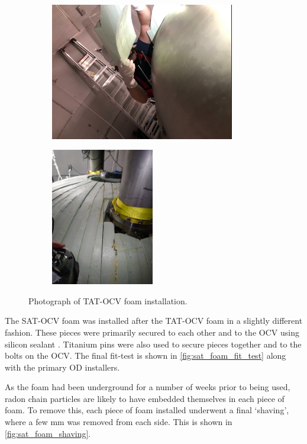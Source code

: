 \begin{figure}[]
\begin{subfigure}{.5\textwidth}
  \centering
  \includegraphics[height=6cm, width=\linewidth]{Figures/Construction/TAT_foam_installation.png}
  \end{subfigure}
  \begin{subfigure}{.5\textwidth}
  \centering
  \includegraphics[height=6cm, width=\linewidth, angle=-90,]{Figures/Construction/TAT_foam_complete.jpg}
  \end{subfigure}
\caption{Photograph of TAT-OCV foam installation.}
\label{fig:TAT_foam_installation}
\end{figure}

\par
The SAT-OCV foam was installed after the TAT-OCV foam in a slightly different fashion.
These pieces were primarily secured to each other and to the OCV using silicon sealant \cite{dowsil_silicone_ref}.
Titanium pins were also used to secure pieces together and to the bolts on the OCV.
The final fit-test is shown in \autoref{fig:sat_foam_fit_test} along with the primary OD installers.

\par
As the foam had been underground for a number of weeks prior to being used, radon chain particles are likely to have embedded themselves in each piece of foam.
To remove this, each piece of foam installed underwent a final `shaving', where a few mm was removed from each side.
This is shown in \autoref{fig:sat_foam_shaving}.

